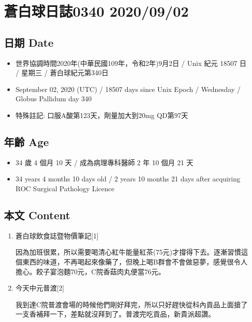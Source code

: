 \documentclass[
]{article}
\providecommand{\tightlist}{%
  \setlength{\itemsep}{0pt}\setlength{\parskip}{0pt}}
\begin{document}
\hypertarget{ux84bcux767dux7403ux65e5ux8a8c0340-20200902}{%
\section{蒼白球日誌0340
2020/09/02}\label{ux84bcux767dux7403ux65e5ux8a8c0340-20200902}}

\hypertarget{ux65e5ux671f-date-1}{%
\subsection{日期 Date}\label{ux65e5ux671f-date-1}}

\begin{itemize}
\tightlist
\item
  世界協調時間2020年(中華民國109年，令和2年)9月2日 / Unix 紀元 18507 日
  / 星期三 / 蒼白球紀元第340日
\item
  September 02, 2020 (UTC) / 18507 days since Unix Epoch / Wednesday /
  Globus Pallidum day 340
\item
  特殊註記: 口服A酸第123天，劑量加大到20mg QD第97天
\end{itemize}

\hypertarget{ux5e74ux9f61-age-1}{%
\subsection{年齡 Age}\label{ux5e74ux9f61-age-1}}

\begin{itemize}
\tightlist
\item
  34 歲 4 個月 10 天 / 成為病理專科醫師 2 年 10 個月 21 天
\item
  34 years 4 months 10 days old / 2 years 10 months 21 days after
  acquiring ROC Surgical Pathology Licence
\end{itemize}

\hypertarget{ux672cux6587-content-1}{%
\subsection{本文 Content}\label{ux672cux6587-content-1}}

\begin{enumerate}
\def\labelenumi{\arabic{enumi}.}
\item
  蒼白球飲食誌暨物價筆記{[}1{]}

  因為加班很累，所以需要喝清心紅牛能量紅茶(75元)才撐得下去。逐漸習慣這個東西的味道，不再喝起來像藥了，但晚上喝B群會不會做惡夢，感覺很令人擔心。餃子宴泡麵70元，C院香菇肉丸便當76元。
\item
  今天中元普渡{[}2{]}

  我到達C院普渡會場的時候他們剛好拜完，所以只好趕快從科內貢品上面搶了一支香補拜一下，差點就沒拜到了。普渡完吃貢品，新貴派超讚。
\end{enumerate}
\end{document}
